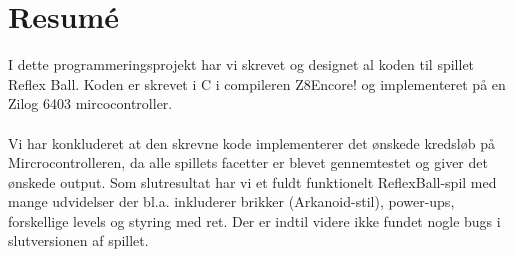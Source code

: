\chapter{Resumé}

I dette programmeringsprojekt har vi skrevet og designet al koden til spillet Reflex Ball. Koden er skrevet i C i compileren Z8Encore! og implementeret på en Zilog 6403 mircocontroller. \\ \\
Vi har konkluderet at den skrevne kode implementerer det ønskede kredsløb på Mircrocontrolleren, da alle spillets facetter er blevet gennemtestet og giver det ønskede output. Som slutresultat har vi et fuldt funktionelt ReflexBall-spil med mange udvidelser der bl.a. inkluderer brikker (Arkanoid-stil), power-ups, forskellige levels og styring med ret. Der er indtil videre ikke fundet nogle bugs i slutversionen af spillet.\\ \\